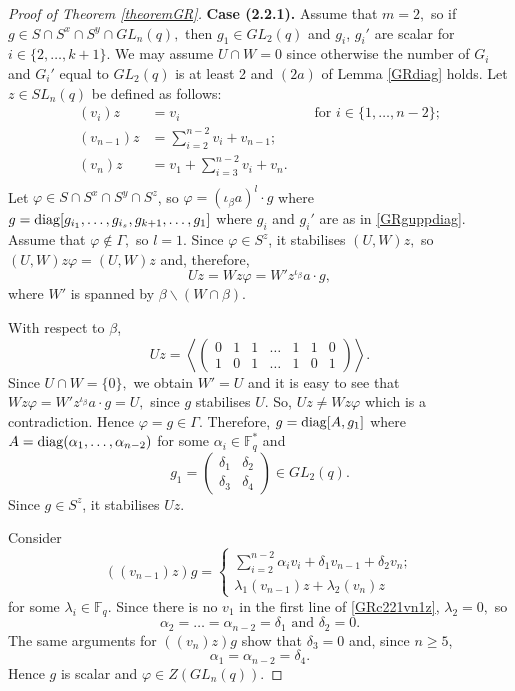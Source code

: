 \begin{proof}[Proof of Theorem {\rm \ref{theoremGR}}]
{\bf Case (2.2.1).} Assume that $m=2,$ so if $g \in S \cap S^x \cap S^y \cap GL_n(q),$ then $g_1 \in GL_2(q)$ and $g_i$, $g_i'$ are scalar for $i \in \{2, \ldots, k+1\}.$ We may assume $U \cap W=0$ since otherwise the number of $G_i$ and $G_i'$ equal to $GL_2(q)$ is at least 2 and $(2a)$  of Lemma \ref{GRdiag} holds. Let $z \in SL_n(q)$ be defined as follows:
\begin{equation}
\label{GRzdefcase221}
\begin{aligned}
(v_i)z & =  v_i &&\text{ for } i \in \{1, \ldots, n-2\}; \\
(v_{n-1})z & =  \sum_{i=2}^{n-2} v_i + v_{n-1};\\
(v_{n})z & =  v_1+ \sum_{i=3}^{n-2} v_i   + v_{n}.\\
\end{aligned} 
\end{equation}
Let $\varphi \in S \cap S^x \cap S^y \cap S^z$, so $\varphi= (\iota_{\beta}a)^l \cdot g$ where $g=\mathrm{diag}[g_{i_1},\ldots, g_{i_s}, g_{k+1}, \ldots, g_1]$ where $g_i$ and $g_i'$ are as in \eqref{GRguppdiag}.  
 Assume that $\varphi \notin \Gamma,$ so $l=1.$ Since $\varphi \in S^z$, it stabilises $(U,W)z,$ so $(U,W)z \varphi =(U,W)z$ and, therefore, 
$$Uz=Wz \varphi = W'z^{\iota_{\beta}}a \cdot g,$$
where $W'$ is spanned by $\beta \backslash (W \cap \beta).$  

 With respect to $\beta$,
$$Uz= \left \langle 
\left(\begin{array}{ccccc|cc}
0  & 1& 1 & \ldots & 1   &           1 &0  \\
1  & 0& 1     & \ldots & 1       &    0       & 1 
\end{array}\right)
\right \rangle.$$
 Since $U \cap W=\{0\},$ we obtain $W'=U$ and it is easy to see that $Wz \varphi = W'z^{\iota_{\beta}}a\cdot g= U,$ since $g$ stabilises $U$. So, $Uz \ne Wz \varphi$ which is a contradiction. Hence $\varphi =g\in \Gamma.$ Therefore, $g=\mathrm{diag}[A,g_1]$ where $A=\mathrm{diag}(\alpha_1, \ldots, \alpha_{n-2})$ for some $\alpha_i \in \mathbb{F}_q^*$ and $$g_1 = \left( \begin{matrix} \delta_1 & \delta_2 \\ \delta_3 & \delta_4  \end{matrix} \right) \in GL_2(q).$$ Since $g \in S^z$, it stabilises $Uz.$
 
 Consider 
\begin{equation}
\label{GRc221vn1z}
 ((v_{n-1})z)g =
 \begin{cases}
 \sum_{i=2}^{n-2} \alpha_i v_i + \delta_1 v_{n-1} + \delta_2 v_n;\\
 \lambda_1 (v_{n-1})z + \lambda_2 (v_{n})z
 \end{cases}
 \end{equation}
 for some $\lambda_{i} \in \mathbb{F}_q.$ Since there is no $v_1$ in the first line of \eqref{GRc221vn1z}, $\lambda_2=0,$ so
 $$\alpha_2 = \ldots = \alpha_{n-2}=\delta_1 \text{ and } \delta_2=0.$$
 The same arguments for $((v_{n})z)g$ show that $\delta_3=0$ and, since $n \ge 5$,
 $$\alpha_1=\alpha_{n-2}=\delta_4.$$
 Hence $g$ is scalar and $\varphi \in Z(GL_n(q)).$
 

\end{proof}
